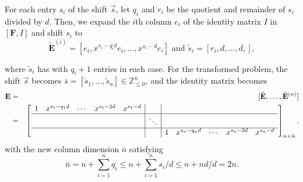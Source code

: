 For each entry $s_{i}$ of the shift $\vec{s}$, let $q_{i}$ and
$r_{i}$ be the quotient and remainder of $s_{i}$ divided by $d$.
Then, we expand the $i$th column $e_{i}$ of the identity matrix
$I$ in $[\mathbf{F},I]$ and shift $s_{i}$ to
\[
\tilde{\mathbf{E}}^{(i)}=\left[e_{i},x^{s_{i}-q_{i}d}e_{i},\dots,x^{s_{i}-d}e_{i}\right]\mbox{ and }\tilde{s}_{i}=\left[r_{i},d,\dots,d,\right],
\]
\begin{comment}
\[
\tilde{\mathbf{E}}^{(i)}=\left[e_{i},x^{d}e_{i},\dots,x^{q_{i}d}e_{i},x^{q_{i}d+r_{i}}e_{i}\right]\mbox{ and }\tilde{s}_{i}=\left[d,\dots,d,r_{i}\right],
\]
\end{comment}
{} where $\tilde{s}_{i}$ has with $q_{i}+1$ entries in each case.
For the transformed problem, the shift $\vec{s}$ becomes $\bar{s}=[\tilde{s}_{1},\dots,\tilde{s}_{n}]\in\mathbb{Z}_{\le0}^{\bar{n}}$,
and the identity matrix becomes
\begin{eqnarray*}
\mathbf{E} & = & [\tilde{\mathbf{E}},\dots,\tilde{\mathbf{E}}^{\left(n\right)}]\\
 & = & \left[\begin{array}{ccccc|c|ccccccc}
1 & x^{s_{1}-q_{1}d} & \cdots & x^{s_{1}-2d} & x^{s_{1}-d} & \\
\hline  &  &  &  &  & \ddots\\
\hline  &  &  &  &  &  & 1 & x^{s_{n}-q_{n}d} & \cdots & x^{s_{n}-2d} & x^{s_{n}-d}
\end{array}\right]_{n\times\bar{n}},
\end{eqnarray*}
 with the new column dimension $\bar{n}$ satisfying 
\[
\bar{n}=n+\sum_{i=1}^{n}q_{i}\le n+\sum_{i=1}^{n}s_{i}/d\le n+nd/d=2n.
\]


